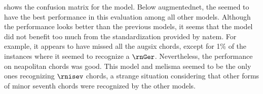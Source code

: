 
 shows the confusion
matrix for the \textcite{mcleod2021modular} model. Below
\gls{augmentednet}, the \textcite{mcleod2021modular} seemed
to have the best performance in this evaluation among all
other models. Although the performance looks better than the
previous models, it seems that the model did not benefit too
much from the standardization provided by \gls{natem}. For
example, it appears to have missed all the \gls{augsix}
chords, except for 1\% of the instances where it seemed to
recognize a $\rnGer$. Nevertheless, the performance on
\gls{neapolitan} chords was good. This model and
\gls{melisma} seemed to be the only ones recognizing
$\rnisev$ chords, a strange situation considering that other
forms of minor seventh chords were recognized by the other
models.

